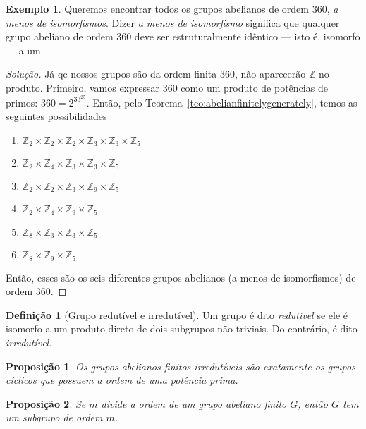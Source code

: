 \documentclass[a4paper,12pt]{report}
\theoremstyle{plain}
\newtheorem{proposicao}{Proposição}[section]
\theoremstyle{definition}
\newtheorem{definicao}{Definição}[section]
\newtheorem{exemplo}{Exemplo}[section]
\newenvironment{solucao}
{\renewcommand\qedsymbol{$\triangle$}\begin{proof}[Solução]}{\end{proof}}
\begin{document}
\begin{exemplo}
	Queremos encontrar todos os grupos abelianos de ordem 360, \emph{a menos de isomorfismos}. Dizer \emph{a menos de isomorfismo} significa que qualquer grupo abeliano de ordem 360 deve ser estruturalmente idêntico --- isto é, isomorfo --- a um 
	\begin{solucao}
		Já qe nossos grupos são da ordem finita 360, não aparecerão $\mathbb{Z}$ no produto. Primeiro, vamos expressar 360 como um produto de potências de primos: $360 = 2^33^25$. Então, pelo Teorema~\ref{teo:abelianfinitelygenerately}, temos as seguintes possibilidades
		\begin{enumerate}
			\item $\mathbb{Z}_2\times\mathbb{Z}_2\times\mathbb{Z}_2\times\mathbb{Z}_3\times\mathbb{Z}_3\times\mathbb{Z}_5$
			\item 	$\mathbb{Z}_2\times\mathbb{Z}_4\times\mathbb{Z}_3\times\mathbb{Z}_3\times\mathbb{Z}_5$ 
			\item 	$\mathbb{Z}_2\times\mathbb{Z}_2\times\mathbb{Z}_3\times\mathbb{Z}_9\times\mathbb{Z}_5$ 
			\item $\mathbb{Z}_2\times\mathbb{Z}_4\times\mathbb{Z}_9\times\mathbb{Z}_5$
			\item $\mathbb{Z}_8\times\mathbb{Z}_3\times\mathbb{Z}_3\times\mathbb{Z}_5$ 
			\item $\mathbb{Z}_8\times\mathbb{Z}_9\times\mathbb{Z}_5$ 
		\end{enumerate}
		
	Então, esses são os seis diferentes grupos abelianos (a menos de isomorfismos) de ordem 360.
	\end{solucao}
\end{exemplo}

\begin{definicao}[Grupo redutível e irredutível]
	Um grupo é dito \emph{redutível} se ele é isomorfo a um produto direto de dois subgrupos não triviais. Do contrário, é dito \emph{irredutível}.
\end{definicao}

\begin{proposicao}
	Os grupos abelianos finitos irredutíveis são exatamente os grupos cíclicos que possuem a ordem de uma potência prima.
\end{proposicao}

\begin{proposicao}
	Se $m$ divide a ordem de um grupo abeliano finito $G$, então $G$ tem um subgrupo de ordem $m$.	
\end{proposicao}
\end{document}
